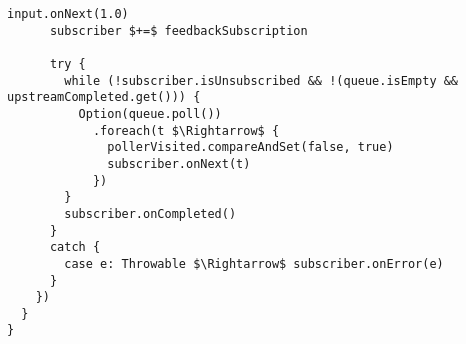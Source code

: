 \begin{lstlisting}[style=ScalaStyle, caption={Implementation of \code{BackpressureObservable}}]
      input.onNext(1.0)
      subscriber $+=$ feedbackSubscription

      try {
        while (!subscriber.isUnsubscribed && !(queue.isEmpty && upstreamCompleted.get())) {
          Option(queue.poll())
            .foreach(t $\Rightarrow$ {
              pollerVisited.compareAndSet(false, true)
              subscriber.onNext(t)
            })
        }
        subscriber.onCompleted()
      }
      catch {
        case e: Throwable $\Rightarrow$ subscriber.onError(e)
      }
    })
  }
}
\end{lstlisting}
